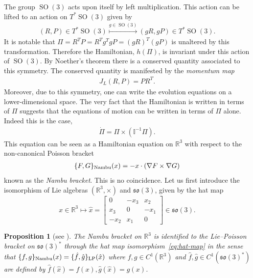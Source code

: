 \documentclass[12pt]{amsart}
\newcommand{\so}{\ensuremath{\mathfrak{so}}}
\newcommand{\R}{\ensuremath{\mathbb{R}}}
\newtheorem{prop}[thm]{Proposition}
\DeclareMathOperator{\SO}{SO}
\begin{document}
  The group $\SO(3)$ acts upon itself by left multiplication.
  This action can be lifted to an action on $T^*\SO(3)$ given by
  \begin{align*}
    (R,P) \in T^* \SO(3) \stackrel{g \in \SO(3) }{\mapsto}
    (g R , gP ) \in T^* \SO(3).
  \end{align*}
  It is notable that $\Pi = R^T P = R^T g^T g P = (gR)^T (gP)$
  is unaltered by this transformation.
  Therefore the Hamiltonian, $h(\Pi)$, is invariant under this action of $\SO(3)$.
  By Noether's theorem there is a conserved quantity associated to 
  this symmetry.
  The conserved quantity is manifested by the \emph{momentum map}
  \begin{align*}
    J_L(R,P) = PR^T .
  \end{align*}
  Moreover, due to this symmetry, one can write the evolution equations
  on a lower-dimensional space.
  The very fact that the Hamiltonian is written in terms of $\Pi$
  suggests that the equations of motion can be written in terms of $\Pi$ alone.
  Indeed this is the case,
  \begin{align}
    \dot{\Pi} = \Pi \times (\mathbb{I}^{-1} \Pi ). \label{eq:rigid_body}
  \end{align}
  This equation can be seen as a Hamiltonian equation on $\mathbb{R}^3$
  with respect to the non-canonical Poisson bracket
  \begin{align}
    \{ F , G \}_{\rm Nambu}(x)  = - x \cdot (\nabla F \times \nabla G) \label{eq:Nambu}
  \end{align}
  known as the \emph{Nambu bracket}.
  This is no coincidence. Let us first introduce the isomorphism of
  Lie algebras $(\R^3,\times)$ and $\so(3)$, given by the hat map
  \begin{equation}\label{eq:hat-map}
    x \in \R^3 \mapsto
    \hat{x} = 
    \begin{bmatrix}
      0   & -x_3 &  x_2 \\
      x_3 & 0    & -x_1 \\
     -x_2 &  x_1 & 0
    \end{bmatrix} \in \so(3).
  \end{equation}
  \begin{prop}[see {\cite[\S 2.5]{HolmBook2}}] \label{prop:Nambu}
    The Nambu bracket on $\mathbb{R}^3$
    is identified to the Lie--Poisson bracket on $\so(3)^*$
    through the hat map isomorphism~\eqref{eq:hat-map}
    in the sense that $\{ f,g\}_{\rm Nambu}( x) = \{ \hat{f} , \hat{g} \}_{\rm LP}( \hat{x})$
    where $f,g \in C^1(\mathbb{R}^3)$ and 
    $\hat{f},\hat{g} \in C^1(\so(3)^*)$ are defined by 
    $\hat{f}( \hat{x} ) = f(x), \hat{g}( \hat{x} ) = g(x)$.
  \end{prop}
\end{document}
